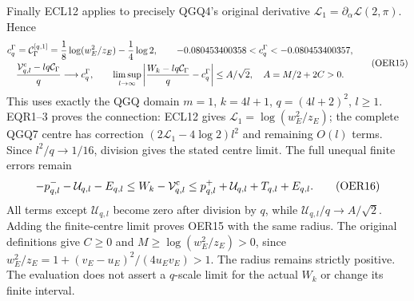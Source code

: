 \documentclass[11pt,a4paper]{article}
\begin{document}
Finally ECL12 applies to precisely QGQ4's original derivative
$\mathcal L_1=\partial_\alpha\mathcal L(2,\pi)$. Hence
\[
\begin{gathered}
 c_q^\Gamma=\mathcal C_\Gamma^{[q,1]}
   =\frac18\log(w_E^2/z_E)-\frac14\log2,\qquad
 -0.080453400358<c_q^\Gamma<-0.080453400357,\\
 \frac{\mathcal V^{\rm c}_{q,l}-lq\mathcal C_\Gamma}{q}
                  \longrightarrow c_q^\Gamma,\qquad
 \limsup_{l\to\infty}
 \left|\frac{W_k-lq\mathcal C_\Gamma}{q}-c_q^\Gamma\right|
             \le A/\sqrt2,\quad A=M/2+2C>0 .
\end{gathered}\tag{OER15}
\]
This uses exactly the QGQ domain $m=1$, $k=4l+1$,
$q=(4l+2)^2$, $l\ge1$. EQR1--3 proves the connection:
ECL12 gives $\mathcal L_1=\log(w_E^2/z_E)$; the complete
QGQ7 centre has correction $(2\mathcal L_1-4\log2)l^2$
and remaining $O(l)$ terms. Since $l^2/q\to1/16$,
division gives the stated centre limit. The full unequal
finite errors remain
\[
 -p^-_{q,l}-\mathcal U_{q,l}-E_{q,l}
 \le W_k-\mathcal V^{\rm c}_{q,l}
 \le p^+_{q,l}+\mathcal U_{q,l}+T_{q,l}+E_{q,l}.
 \tag{OER16}
\]
All terms except $\mathcal U_{q,l}$ become zero after division
by $q$, while $\mathcal U_{q,l}/q\to A/\sqrt2$.
Adding the finite-centre limit proves OER15 with the same
radius. The original definitions give $C\ge0$ and
$M\ge\log(w_E^2/z_E)>0$, since
$w_E^2/z_E=1+(v_E-u_E)^2/(4u_Ev_E)>1$.
The radius remains strictly positive. The evaluation does not
assert a $q$-scale limit for the actual $W_k$ or change its
finite interval.
\end{document}
